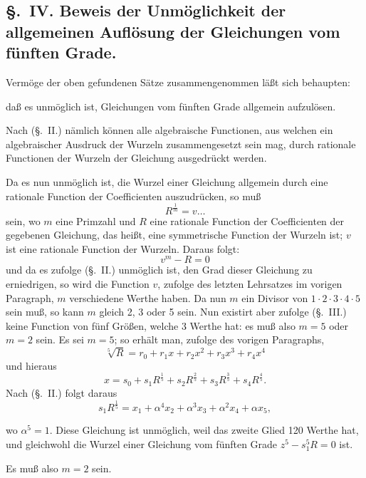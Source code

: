 \documentclass{article}
\begin{document}
\subsection*{§.~IV. Beweis der Unmöglichkeit der allgemeinen Auflösung der Gleichungen vom fünften Grade.}

Vermöge der oben gefundenen Sätze zusammengenommen läßt sich behaupten:

daß es unmöglich ist, Gleichungen vom fünften Grade allgemein aufzulösen.

Nach (§.~II.) nämlich können alle algebraische Functionen, aus welchen ein algebraischer Ausdruck der Wurzeln zusammengesetzt sein mag, durch rationale Functionen der Wurzeln der Gleichung ausgedrückt werden.

Da es nun unmöglich ist, die Wurzel einer Gleichung allgemein durch eine rationale Function der Coefficienten auszudrücken, so muß
\[ R^{\frac{1}{m}} = v \ldots \]
sein, wo $m$ eine Primzahl und $R$ eine rationale Function der Coefficienten der gegebenen Gleichung, das heißt, eine symmetrische Function der Wurzeln ist; $v$ ist eine rationale Function der Wurzeln. Daraus folgt:
\[ v^{m} - R = 0 \]
und da es zufolge (§.~II.) unmöglich ist, den Grad dieser Gleichung zu erniedrigen, so wird die Function $v$, zufolge des letzten Lehrsatzes im vorigen Paragraph, $m$ verschiedene Werthe haben. Da nun $m$ ein Divisor von $1 \cdot 2 \cdot 3 \cdot 4 \cdot 5$ sein muß, so kann $m$ gleich 2, 3 oder 5 sein. Nun existirt aber zufolge (§.~III.) keine Function von fünf Größen, welche 3 Werthe hat: es muß also $m = 5$ oder $m = 2$ sein. Es sei $m = 5$; so erhält man, zufolge des vorigen Paragraphs,
\[ \sqrt[5]{R} = r_0 + r_1 x + r_2 x^{2} + r_3 x^{3} + r_4 x^{4} \]
und hieraus
\[ x = s_0 + s_1 R^{\frac{1}{5}} + s_2 R^{\frac{2}{5}} + s_3 R^{\frac{3}{5}} + s_4 R^{\frac{4}{5}}. \]
Nach (§.~II.) folgt daraus
\[ s_1 R^{\frac{1}{5}} = x_1 + \alpha^{4} x_2 + \alpha^{3} x_3 + \alpha^{2} x_4 + \alpha x_5, \]

wo $\alpha^{5} = 1$. Diese Gleichung ist unmöglich, weil das zweite Glied 120 Werthe hat, und gleichwohl die Wurzel einer Gleichung vom fünften Grade $z^{5} - s_1^{5} R = 0$ ist.

Es muß also $m = 2$ sein.
\end{document}
